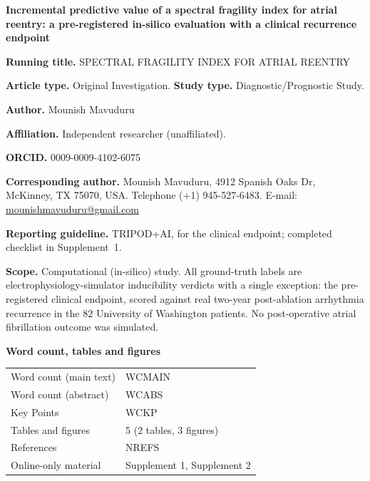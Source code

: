 \documentclass[11pt]{article}
\begin{document}
\thispagestyle{empty}

\begin{center}
{\Large\bfseries Incremental predictive value of a spectral fragility index for
atrial reentry: a pre-registered in-silico evaluation with a clinical
recurrence endpoint\par}
\end{center}

\vspace{0.7em}
\noindent\textbf{Running title.} SPECTRAL FRAGILITY INDEX FOR ATRIAL REENTRY

\smallskip
\noindent\textbf{Article type.} Original Investigation. \textbf{Study type.}
Diagnostic/Prognostic Study.

\smallskip
\noindent\textbf{Author.} Mounish Mavuduru

\smallskip
\noindent\textbf{Affiliation.} Independent researcher (unaffiliated).

\smallskip
\noindent\textbf{ORCID.} 0009-0009-4102-6075

\smallskip
\noindent\textbf{Corresponding author.} Mounish Mavuduru, 4912 Spanish Oaks Dr,
McKinney, TX 75070, USA. Telephone (+1) 945-527-6483. E-mail:
\href{mailto:mounishmavuduru@gmail.com}{mounishmavuduru@gmail.com}

\vspace{0.7em}
\noindent\textbf{Reporting guideline.} TRIPOD+AI, for the clinical endpoint;
completed checklist in Supplement~1.

\smallskip
\noindent\textbf{Scope.} Computational (in-silico) study. All ground-truth labels
are electrophysiology-simulator inducibility verdicts with a single exception:
the pre-registered clinical endpoint, scored against real two-year
post-ablation arrhythmia recurrence in the $82$ University of Washington
patients. No post-operative atrial fibrillation outcome was simulated.

\vspace{0.7em}
\noindent\textbf{Word count, tables and figures}

\smallskip
\begin{tabular}{@{}ll@{}}
\toprule
Word count (main text)  & WCMAIN \\
Word count (abstract)   & WCABS \\
Key Points              & WCKP \\
Tables and figures      & 5 (2 tables, 3 figures) \\
References              & NREFS \\
Online-only material    & Supplement 1, Supplement 2 \\
\bottomrule
\end{tabular}
\end{document}
